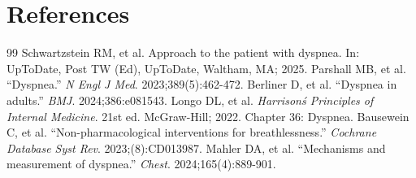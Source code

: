 \section*{References}
\begin{thebibliography}{99}
 Schwartzstein RM, et al. Approach to the patient with dyspnea. In: UpToDate, Post TW (Ed), UpToDate, Waltham, MA; 2025.
 Parshall MB, et al. ``Dyspnea.'' \emph{N Engl J Med}. 2023;389(5):462-472.
 Berliner D, et al. ``Dyspnea in adults.'' \emph{BMJ}. 2024;386:e081543.
 Longo DL, et al. \emph{Harrison\'s Principles of Internal Medicine}. 21st ed. McGraw-Hill; 2022. Chapter 36: Dyspnea.
 Bausewein C, et al. ``Non-pharmacological interventions for breathlessness.'' \emph{Cochrane Database Syst Rev}. 2023;(8):CD013987.
 Mahler DA, et al. ``Mechanisms and measurement of dyspnea.'' \emph{Chest}. 2024;165(4):889-901.
\end{thebibliography}
